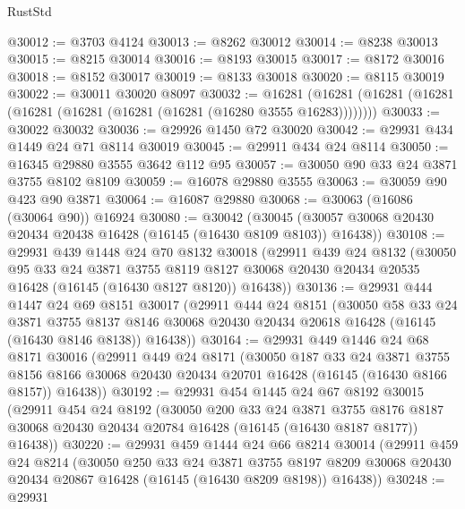 \begin{lexlean}{RustStd}
\begin{coremodule}
@30012 := @3703 @4124
@30013 := @8262 @30012
@30014 := @8238 @30013
@30015 := @8215 @30014
@30016 := @8193 @30015
@30017 := @8172 @30016
@30018 := @8152 @30017
@30019 := @8133 @30018
@30020 := @8115 @30019
@30022 := @30011 @30020 @8097
@30032 := @16281
    (@16281 (@16281 (@16281 (@16281 (@16281 (@16281 (@16281 (@16280 @3555 @16283))))))))
@30033 := @30022 @30032
@30036 := @29926 @1450 @72 @30020
@30042 := @29931 @434 @1449 @24 @71 @8114 @30019
@30045 := @29911 @434 @24 @8114
@30050 := @16345 @29880 @3555 @3642 @112 @95
@30057 := @30050 @90 @33 @24 @3871 @3755 @8102 @8109
@30059 := @16078 @29880 @3555
@30063 := @30059 @90 @423 @90 @3871
@30064 := @16087 @29880
@30068 := @30063 (@16086 (@30064 @90)) @16924
@30080 := @30042
    (@30045 (@30057 @30068 @20430 @20434 @20438 @16428 (@16145 (@16430 @8109 @8103)) @16438))
@30108 := @29931
    @439
    @1448
    @24
    @70
    @8132
    @30018
    (@29911
      @439
      @24
      @8132
      (@30050
        @95
        @33
        @24
        @3871
        @3755
        @8119
        @8127
        @30068
        @20430
        @20434
        @20535
        @16428
        (@16145 (@16430 @8127 @8120))
        @16438))
@30136 := @29931
    @444
    @1447
    @24
    @69
    @8151
    @30017
    (@29911
      @444
      @24
      @8151
      (@30050
        @58
        @33
        @24
        @3871
        @3755
        @8137
        @8146
        @30068
        @20430
        @20434
        @20618
        @16428
        (@16145 (@16430 @8146 @8138))
        @16438))
@30164 := @29931
    @449
    @1446
    @24
    @68
    @8171
    @30016
    (@29911
      @449
      @24
      @8171
      (@30050
        @187
        @33
        @24
        @3871
        @3755
        @8156
        @8166
        @30068
        @20430
        @20434
        @20701
        @16428
        (@16145 (@16430 @8166 @8157))
        @16438))
@30192 := @29931
    @454
    @1445
    @24
    @67
    @8192
    @30015
    (@29911
      @454
      @24
      @8192
      (@30050
        @200
        @33
        @24
        @3871
        @3755
        @8176
        @8187
        @30068
        @20430
        @20434
        @20784
        @16428
        (@16145 (@16430 @8187 @8177))
        @16438))
@30220 := @29931
    @459
    @1444
    @24
    @66
    @8214
    @30014
    (@29911
      @459
      @24
      @8214
      (@30050
        @250
        @33
        @24
        @3871
        @3755
        @8197
        @8209
        @30068
        @20430
        @20434
        @20867
        @16428
        (@16145 (@16430 @8209 @8198))
        @16438))
@30248 := @29931

\end{coremodule}
\end{lexlean}
